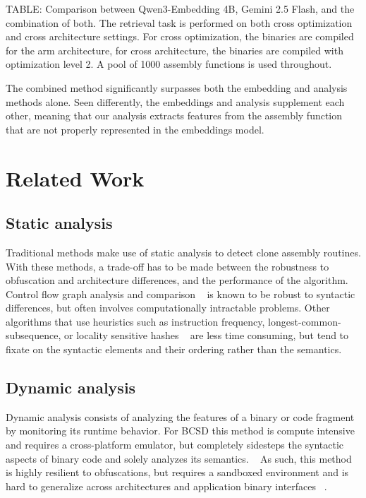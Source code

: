 \documentclass[conference,compsoc]{IEEEtran}
\begin{document}
TABLE: Comparison between Qwen3-Embedding 4B, Gemini 2.5 Flash, and the combination of both. The retrieval task is performed on both cross
optimization and cross architecture settings. For cross optimization, the binaries are compiled for the arm architecture, for cross architecture,
the binaries are compiled with optimization level 2. A pool of 1000 assembly functions is used throughout.

The combined method significantly surpasses both the embedding and analysis methods alone. Seen differently, the embeddings and analysis supplement
each other, meaning that our analysis extracts features from the assembly function that are not properly represented in the embeddings model.

\section{Related Work}

\subsection{Static analysis}

Traditional methods make use of static analysis to detect clone assembly routines. With these methods, a trade-off has
to be made between the robustness to obfuscation and architecture differences, and the performance of the algorithm. ~\cite{BCSDsurvey}
Control flow graph analysis and comparison ~\cite{BinDiff,graph-bug-search} is known to be robust to syntactic differences, but often
involves computationally intractable problems. Other algorithms that use heuristics such as instruction frequency,
longest-common-subsequence, or locality sensitive hashes ~\cite{clones.net,op-seq,sem-hash} are less time consuming, but tend to fixate on the syntactic
elements and their ordering rather than the semantics.

\subsection{Dynamic analysis}

Dynamic analysis consists of analyzing the features of a binary or code fragment by monitoring its runtime behavior. For BCSD
this method is compute intensive and requires a cross-platform emulator, but completely sidesteps the syntactic aspects of binary code
and solely analyzes its semantics. ~\cite{BCSD} As such, this method is highly resilient to obfuscations, but requires a sandboxed environment
and is hard to generalize across architectures and application binary interfaces ~\cite{blanket-exec}.
\end{document}
